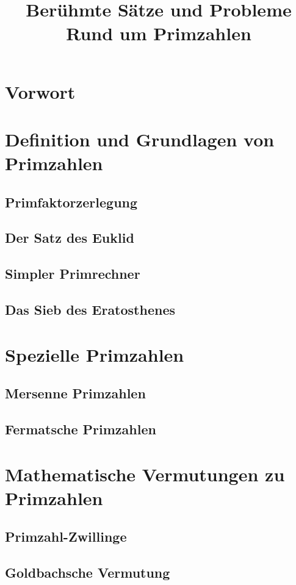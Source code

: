 \documentclass[11pt]{article}
\begin{document}
\title{Berühmte Sätze und Probleme Rund um Primzahlen}
\tableofcontents
\newpage
\section*{Vorwort}

\newpage
\section{Definition und Grundlagen von Primzahlen}

\subsection{Primfaktorzerlegung}

\newpage
\subsection{Der Satz des Euklid}
\newpage
\subsection{Simpler Primrechner}

\newpage
\subsection{Das Sieb des Eratosthenes}

\newpage
\section{Spezielle Primzahlen}
\subsection{Mersenne Primzahlen}
\newpage
\subsection{Fermatsche Primzahlen}
\newpage
\section{Mathematische Vermutungen zu Primzahlen}
\subsection{Primzahl-Zwillinge}
\newpage
\subsection{Goldbachsche Vermutung}
\newpage
\end{document}
